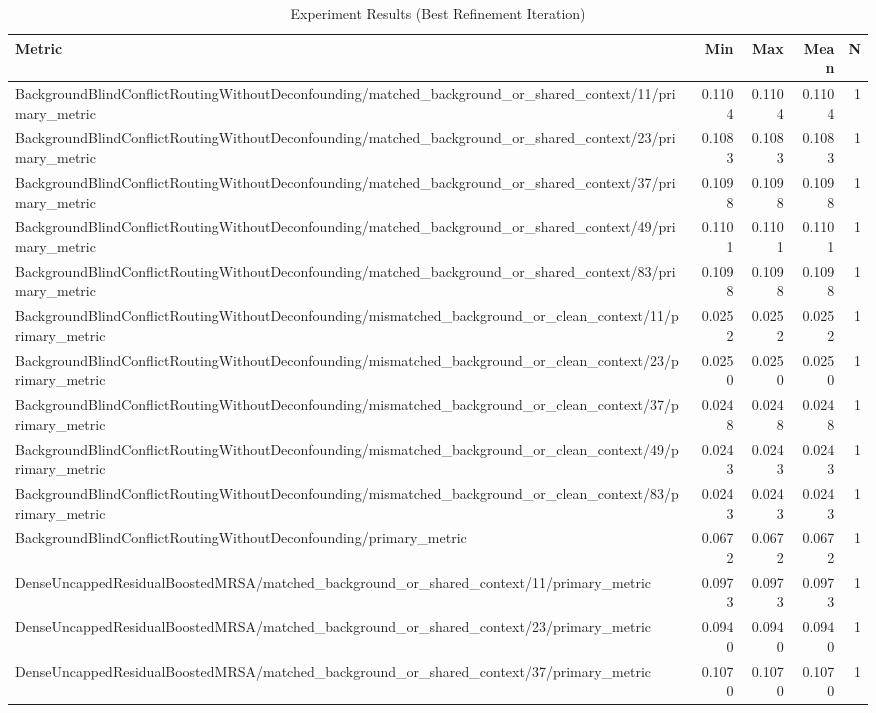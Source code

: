 \begin{table}[h]
\centering
\caption{Experiment Results (Best Refinement Iteration)}
\begin{tabular}{lrrrr}
\hline
Metric & Min & Max & Mean & N \\
\hline
BackgroundBlindConflictRoutingWithoutDeconfounding/matched_background_or_shared_context/11/primary_metric & 0.1104 & 0.1104 & 0.1104 & 1 \\
BackgroundBlindConflictRoutingWithoutDeconfounding/matched_background_or_shared_context/23/primary_metric & 0.1083 & 0.1083 & 0.1083 & 1 \\
BackgroundBlindConflictRoutingWithoutDeconfounding/matched_background_or_shared_context/37/primary_metric & 0.1098 & 0.1098 & 0.1098 & 1 \\
BackgroundBlindConflictRoutingWithoutDeconfounding/matched_background_or_shared_context/49/primary_metric & 0.1101 & 0.1101 & 0.1101 & 1 \\
BackgroundBlindConflictRoutingWithoutDeconfounding/matched_background_or_shared_context/83/primary_metric & 0.1098 & 0.1098 & 0.1098 & 1 \\
BackgroundBlindConflictRoutingWithoutDeconfounding/mismatched_background_or_clean_context/11/primary_metric & 0.0252 & 0.0252 & 0.0252 & 1 \\
BackgroundBlindConflictRoutingWithoutDeconfounding/mismatched_background_or_clean_context/23/primary_metric & 0.0250 & 0.0250 & 0.0250 & 1 \\
BackgroundBlindConflictRoutingWithoutDeconfounding/mismatched_background_or_clean_context/37/primary_metric & 0.0248 & 0.0248 & 0.0248 & 1 \\
BackgroundBlindConflictRoutingWithoutDeconfounding/mismatched_background_or_clean_context/49/primary_metric & 0.0243 & 0.0243 & 0.0243 & 1 \\
BackgroundBlindConflictRoutingWithoutDeconfounding/mismatched_background_or_clean_context/83/primary_metric & 0.0243 & 0.0243 & 0.0243 & 1 \\
BackgroundBlindConflictRoutingWithoutDeconfounding/primary_metric & 0.0672 & 0.0672 & 0.0672 & 1 \\
DenseUncappedResidualBoostedMRSA/matched_background_or_shared_context/11/primary_metric & 0.0973 & 0.0973 & 0.0973 & 1 \\
DenseUncappedResidualBoostedMRSA/matched_background_or_shared_context/23/primary_metric & 0.0940 & 0.0940 & 0.0940 & 1 \\
DenseUncappedResidualBoostedMRSA/matched_background_or_shared_context/37/primary_metric & 0.1070 & 0.1070 & 0.1070 & 1 \\

\end{tabular}
\end{table}
